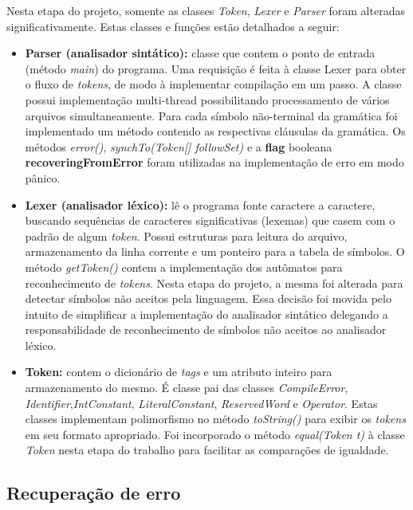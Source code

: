 Nesta etapa do projeto, somente as classes \textit{Token}, \textit{Lexer} e \textit{Parser} foram alteradas significativamente. Estas classes e funções estão detalhados a seguir:

\begin{itemize}
    \item \textbf{Parser (analisador sintático):} classe que contem o ponto de entrada (método \textit{main}) do programa. Uma requisição é feita à classe Lexer para obter o fluxo de \textit{tokens}, de modo à implementar compilação em um passo. A classe possui implementação multi-thread possibilitando processamento de vários arquivos simultaneamente. Para cada símbolo não-terminal da gramática foi implementado um método contendo as respectivas cláusulas da gramática. Os métodos \textit{error()}, \textit{synchTo(Token[] followSet)} e a \textbf{flag} booleana \textbf{recoveringFromError} foram utilizadas na implementação de erro em modo pânico.
    
    \item \textbf{Lexer (analisador léxico):} lê o programa fonte caractere a caractere, buscando sequências de caracteres significativas (lexemas) que casem com o padrão de algum \textit{token}. Possui estruturas para leitura do arquivo, armazenamento da linha corrente e um ponteiro para a tabela de símbolos. O método \textit{getToken()} contem a implementação dos autômatos para reconhecimento de \textit{tokens}. Nesta etapa do projeto, a mesma foi alterada para detectar símbolos não aceitos pela linguagem. Essa decisão foi movida pelo intuito de simplificar a implementação do analisador sintático delegando a responsabilidade de reconhecimento de símbolos não aceitos ao analisador léxico.
    
    \item \textbf{Token:} contem o dicionário de \textit{tags} e um atributo inteiro para armazenamento do mesmo. É classe pai das classes \textit{CompileError}, \textit{Identifier},\textit{IntConstant}, \textit{LiteralConstant}, \textit{ReservedWord} e \textit{Operator}. Estas classes implementam polimorfismo no método \textit{toString()} para exibir os \textit{tokens} em seu formato apropriado. Foi incorporado o método \textit{equal(Token t)} à classe \textit{Token} nesta etapa do trabalho para facilitar as comparações de igualdade.
    
\end{itemize}

\subsection{Recuperação de erro}

